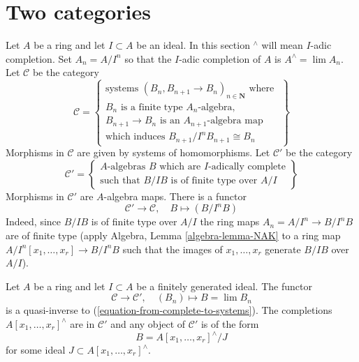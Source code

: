 \section{Two categories}
\label{section-two-categories}

\noindent
Let $A$ be a ring and let $I \subset A$ be an ideal.
In this section ${}^\wedge$ will mean $I$-adic completion.
Set $A_n = A/I^n$ so that the $I$-adic completion of $A$ is
$A^\wedge = \lim A_n$. Let $\mathcal{C}$ be the
category
\begin{equation}
\label{equation-C}
\mathcal{C} =
\left\{
\begin{matrix}
\text{systems }(B_n, B_{n + 1} \to B_n)_{n \in \mathbf{N}}\text{ where }\\
B_n\text{ is a finite type }A_n\text{-algebra,}\\
B_{n + 1} \to B_n\text{ is an }A_{n + 1}\text{-algebra map}\\
\text{which induces }B_{n + 1}/I^nB_{n + 1} \cong B_n
\end{matrix}
\right\}
\end{equation}
Morphisms in $\mathcal{C}$ are given by systems of homomorphisms.
Let $\mathcal{C}'$ be the category
\begin{equation}
\label{equation-C-prime}
\mathcal{C}' =
\left\{
\begin{matrix}
A\text{-algebras }B\text{ which are }I\text{-adically complete}\\
\text{such that }B/IB\text{ is of finite type over }A/I
\end{matrix}
\right\}
\end{equation}
Morphisms in $\mathcal{C}'$ are $A$-algebra maps. There is a functor
\begin{equation}
\label{equation-from-complete-to-systems}
\mathcal{C}' \longrightarrow \mathcal{C},\quad
B \longmapsto (B/I^nB)
\end{equation}
Indeed, since $B/IB$ is of finite type over $A/I$ the ring maps
$A_n = A/I^n \to B/I^nB$ are of finite type
(apply Algebra, Lemma \ref{algebra-lemma-NAK}
to a ring map $A/I^n[x_1, \ldots, x_r] \to B/I^nB$
such that the images of $x_1, \ldots, x_r$ generate $B/IB$
over $A/I$).

\begin{lemma}
\label{lemma-topologically-finite-type}
Let $A$ be a ring and let $I \subset A$ be a finitely generated ideal.
The functor
$$
\mathcal{C} \longrightarrow \mathcal{C}',\quad
(B_n) \longmapsto B = \lim B_n
$$
is a quasi-inverse to (\ref{equation-from-complete-to-systems}).
The completions $A[x_1, \ldots, x_r]^\wedge$ are in $\mathcal{C}'$ and
any object of $\mathcal{C}'$ is of the form
$$
B = A[x_1, \ldots, x_r]^\wedge / J
$$
for some ideal $J \subset A[x_1, \ldots, x_r]^\wedge$.
\end{lemma}

